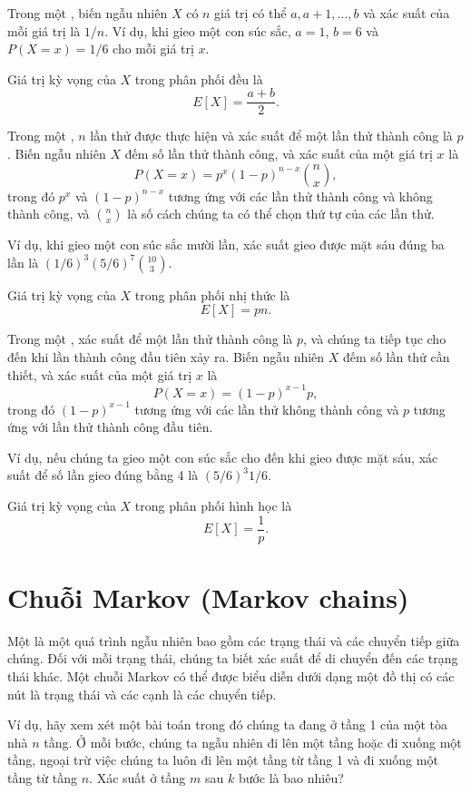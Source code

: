 Trong một ,
biến ngẫu nhiên $X$ có $n$ giá trị có thể
$a,a+1,\ldots,b$ và xác suất của mỗi giá trị là $1/n$.
Ví dụ, khi gieo một con súc sắc,
$a=1$, $b=6$ và $P(X=x)=1/6$ cho mỗi giá trị $x$.

Giá trị kỳ vọng của $X$ trong phân phối đều là
\[E[X] = \frac{a+b}{2}.\]

Trong một , $n$ lần thử
được thực hiện
và xác suất để một lần thử thành công
là $p$.
Biến ngẫu nhiên $X$ đếm số lần
thử thành công,
và xác suất của một giá trị $x$ là
\[P(X=x)=p^x (1-p)^{n-x} {n \choose x},\]
trong đó $p^x$ và $(1-p)^{n-x}$ tương ứng với
các lần thử thành công và không thành công,
và ${n \choose x}$ là số cách
chúng ta có thể chọn thứ tự của các lần thử.

Ví dụ, khi gieo một con súc sắc mười lần,
xác suất gieo được mặt sáu đúng
ba lần là $(1/6)^3 (5/6)^7 {10 \choose 3}$.

Giá trị kỳ vọng của $X$ trong phân phối nhị thức là
\[E[X] = pn.\]

Trong một ,
xác suất để một lần thử thành công là $p$,
và chúng ta tiếp tục cho đến khi lần thành công đầu tiên xảy ra.
Biến ngẫu nhiên $X$ đếm số lần
thử cần thiết, và xác suất của
một giá trị $x$ là
\[P(X=x)=(1-p)^{x-1} p,\]
trong đó $(1-p)^{x-1}$ tương ứng với các lần thử không thành công
và $p$ tương ứng với lần thử thành công đầu tiên.

Ví dụ, nếu chúng ta gieo một con súc sắc cho đến khi gieo được mặt sáu,
xác suất để số lần gieo
đúng bằng 4 là $(5/6)^3 1/6$.

Giá trị kỳ vọng của $X$ trong phân phối hình học là
\[E[X]=\frac{1}{p}.\]

\section{Chuỗi Markov (Markov chains)}


Một 
là một quá trình ngẫu nhiên
bao gồm các trạng thái và các chuyển tiếp giữa chúng.
Đối với mỗi trạng thái, chúng ta biết xác suất
để di chuyển đến các trạng thái khác.
Một chuỗi Markov có thể được biểu diễn dưới dạng một đồ thị
có các nút là trạng thái và các cạnh là các chuyển tiếp.

Ví dụ, hãy xem xét một bài toán
trong đó chúng ta đang ở tầng 1 của một tòa nhà $n$ tầng.
Ở mỗi bước, chúng ta ngẫu nhiên đi lên một tầng
hoặc đi xuống một tầng, ngoại trừ việc chúng ta luôn
đi lên một tầng từ tầng 1 và đi xuống một tầng
từ tầng $n$.
Xác suất ở tầng $m$
sau $k$ bước là bao nhiêu?


